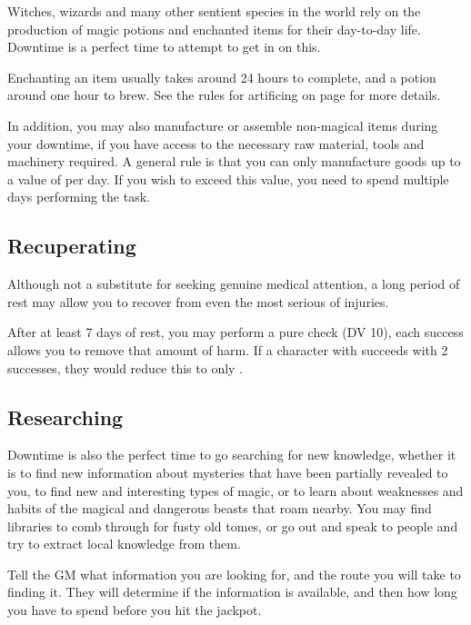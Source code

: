 Witches, wizards and many other sentient species in the world rely on the production of magic potions and enchanted items for their day-to-day life. Downtime is a perfect time to attempt to get in on this. 

Enchanting an item usually takes around 24 hours to complete, and a potion around one hour to brew. See the rules for artificing on page \pageref{S:Artificing} for more details. 

In addition, you may also manufacture or assemble non-magical items during your downtime, if you have access to the necessary raw material, tools and machinery required. A general rule is that you can only manufacture goods up to a value of  per day. If you wish to exceed this value, you need to spend multiple days performing the task.

\subsection{Recuperating}

Although not a substitute for seeking genuine medical attention, a long period of rest may allow you to recover from even the most serious of injuries. 

After at least 7 days of rest, you may perform a pure  check (DV 10), each success allows you to remove that amount of harm. If a character with  succeeds with 2 successes, they would reduce this to only .


\subsection{Researching}

Downtime is also the perfect time to go searching for new knowledge, whether it is to find new information about mysteries that have been partially revealed to you, to find new and interesting types of magic, or to learn about weaknesses and habits of the magical and dangerous beasts that roam nearby. You may find libraries to comb through for fusty old tomes, or go out and speak to people and try to extract local knowledge from them. 

Tell the GM what information you are looking for, and the route you will take to finding it. They will determine if the information is available, and then how long you have to spend before you hit the jackpot. 

